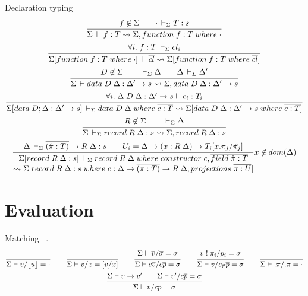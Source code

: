 \documentclass[acmlarge,fleqn]{acmart}\settopmatter{}
\begin{document}
Declaration typing 
\begin{gather*}
\ru{f \not\in \Sigma \qquad \cdot \ders T : s}
   {\Sigma \der f : T \leadsto \Sigma, function\; f : T\; where\; \cdot}
\\
\ru{\forall i.\; f : T \ders cl_i}
   {\Sigma[function\; f : T\; where\; \cdot] \der \overline{cl} \leadsto \Sigma[function\; f : T\; where\; \overline{cl}]}
\\
\ru{D \not\in \Sigma \qquad \ders \Delta \qquad \Delta \ders \Delta'}
   {\Sigma \der data\; D\; \Delta : \Delta' \to s \leadsto \Sigma, data\; D\; \Delta : \Delta' \to s}
\\
\ru{\forall i.\; \Delta | D\; \Delta : \Delta' \to s \vdash c_i : T_i}
   {\Sigma[data\; D; \Delta : \Delta' \to s] \ders data\; D\; \Delta\; where\; \overline{c : T} \leadsto \Sigma[data\; D\; \Delta : \Delta' \to s\; where\; \overline{c : T}]}
\\
\ru{R \not\in \Sigma \qquad \ders \Delta}
   {\Sigma \ders record\; R \; \Delta : s \leadsto \Sigma, record\; R\; \Delta : s}
\\
\ru{\Delta \ders \overline{(\hat{\pi} : T)} \to R\; \Delta : s \qquad
    U_i = \Delta \to (x : R\; \Delta) \to T_i[x.\pi_j / \hat{\pi_j}] }
   {\Sigma[record\; R\; \Delta : s] \ders record\; R\; \Delta\; where\; constructor\; c, \overline{field\; \hat{\pi} : T} \\  \leadsto \Sigma[record\; R\; \Delta : s\; where\; c : \Delta \to \overline{(\pi : T)} \to R\; \Delta; projections\; \overline{\pi : U}]} x \not\in dom(\Delta)
\end{gather*}




\section{Evaluation}
\label{sec:evaluation}


Matching \ .
\begin{gather*}
\ru{}{\Sigma \vdash v/\lfloor u \rfloor = \cdot} %
\qquad
\ru{}{\Sigma \vdash v/x = [v/x]} %
\qquad
\ru
  {\Sigma \vdash \overline{v}/\overline{\sigma} = \sigma}
  {\Sigma \vdash c\overline{v}/c\overline{p} = \sigma}  %
\qquad
\ru{v \bang \pi_i / p_i = \sigma}
{\Sigma \vdash v / \cpi \overline{p} = \sigma} %
\qquad
\ru{}{\Sigma \vdash .\pi/.\pi = \cdot} %
\\
\ru{\Sigma \vdash v \to v' \qquad \Sigma \vdash v'/c\overline{p} = \sigma}
{\Sigma \vdash v / c \overline{p} = \sigma} %
\end{gather*}
\end{document}
